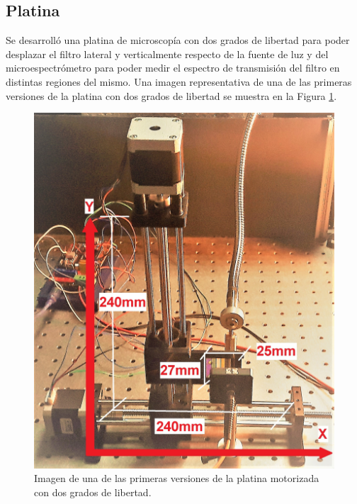 
\singlespacing
\subsection{Platina \href{https://github.com/jrr1984/open\_frame\_XYStage}{\faGithub} \href{https://github.com/jrr1984/open_frame_XYStage/tree/master/3dprintedparts/STLs}{\faCubes}}
\label{sec:platina}

\hspace{0.5cm}Se desarrolló una platina de microscopía con dos grados de libertad para poder desplazar el filtro lateral y verticalmente respecto de la fuente de luz y del microespectrómetro para poder medir el espectro de transmisión del filtro en distintas regiones del mismo. Una imagen representativa de una de las primeras versiones de la platina con dos grados de libertad se muestra en la Figura \ref{fig:plato0}.


\begin{figure}[H]
	\centering
	\includegraphics[scale=0.16]{Figs/microespectrometro/stageearly.jpg}
	\caption{Imagen de una de las primeras versiones de la platina motorizada con dos grados de libertad.}
	\label{fig:plato0}
\end{figure}


